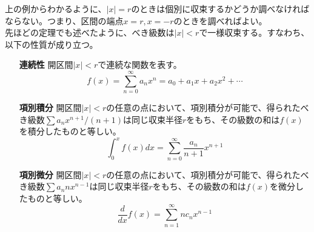 \documentclass[a4j,dvipdfmx]{jsarticle}
\begin{document}
                上の例からわかるように、$|x|=r$のときは個別に収束するかどうか調べなければならない。つまり、区間の端点$x=r,x=-r$のときを調べればよい。\\

                先ほどの定理でも述べたように、べき級数は$|x|<r$で一様収束する。すなわち、以下の性質が成り立つ。
                \begin{enumerate}
                    \item[\textbf{連続性}] 開区間$|x|<r$で連続な関数を表す。
                        \begin{equation}
                            f(x)=\sum_{n=0}^{\infty}a_nx^n = a_0+a_1x+a_2x^2+\cdots
                        \end{equation}
                    \item[\textbf{項別積分}] 開区間$|x|<r$の任意の点において、項別積分が可能で、得られたべき級数$\sum a_n x^{n+1}/(n+1)$は同じ収束半径$r$をもち、その級数の和は$f(x)$を積分したものと等しい。
                        \begin{equation}
                            \int_{0}^{x}f(x)dx=\sum_{n=0}^{\infty}\frac{a_n}{n+1}x^{n+1}
                        \end{equation}
                    \item[\textbf{項別微分}] 開区間$|x|<r$の任意の点において、項別積分が可能で、得られたべき級数$\sum a_n nx^{n-1}$は同じ収束半径$r$をもち、その級数の和は$f(x)$を微分したものと等しい。 
                        \begin{equation}
                            \frac{d}{dx}f(x)=\sum_{n=1}^{\infty}nc_{n}x^{n-1}
                        \end{equation}
                \end{enumerate}
\end{document}
